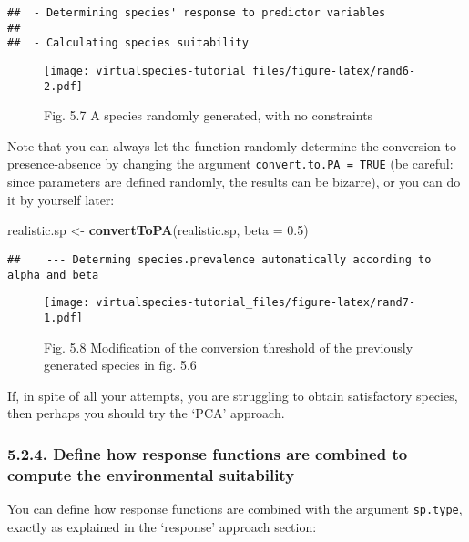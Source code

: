 \documentclass[]{article}
\newenvironment{Shaded}{\begin{snugshade}}{\end{snugshade}}
\newcommand{\KeywordTok}[1]{\textcolor[rgb]{0.13,0.29,0.53}{\textbf{#1}}}
\newcommand{\DataTypeTok}[1]{\textcolor[rgb]{0.13,0.29,0.53}{#1}}
\newcommand{\FloatTok}[1]{\textcolor[rgb]{0.00,0.00,0.81}{#1}}
\newcommand{\StringTok}[1]{\textcolor[rgb]{0.31,0.60,0.02}{#1}}
\newcommand{\NormalTok}[1]{#1}
\begin{document}
\begin{verbatim}
##  - Determining species' response to predictor variables
## 
##  - Calculating species suitability
\end{verbatim}

\begin{figure}
\centering
\texttt{[image: virtualspecies-tutorial\_files/figure-latex/rand6-2.pdf]}
\caption{Fig. 5.7 A species randomly generated, with no constraints}
\end{figure}

Note that you can always let the function randomly determine the
conversion to presence-absence by changing the argument
\texttt{convert.to.PA\ =\ TRUE} (be careful: since parameters are
defined randomly, the results can be bizarre), or you can do it by
yourself later:

\begin{Shaded}
\begin{Highlighting}[]
\NormalTok{realistic.sp <-}\StringTok{ }\KeywordTok{convertToPA}\NormalTok{(realistic.sp, }\DataTypeTok{beta =} \FloatTok{0.5}\NormalTok{)}
\end{Highlighting}
\end{Shaded}

\begin{verbatim}
##    --- Determing species.prevalence automatically according to alpha and beta
\end{verbatim}

\begin{figure}
\centering
\texttt{[image: virtualspecies-tutorial\_files/figure-latex/rand7-1.pdf]}
\caption{Fig. 5.8 Modification of the conversion threshold of the
previously generated species in fig. 5.6}
\end{figure}

If, in spite of all your attempts, you are struggling to obtain
satisfactory species, then perhaps you should try the `PCA' approach.

\subsubsection{5.2.4. Define how response functions are combined to
compute the environmental
suitability}\label{define-how-response-functions-are-combined-to-compute-the-environmental-suitability}

You can define how response functions are combined with the argument
\texttt{sp.type}, exactly as explained in the `response' approach
section:
\end{document}

